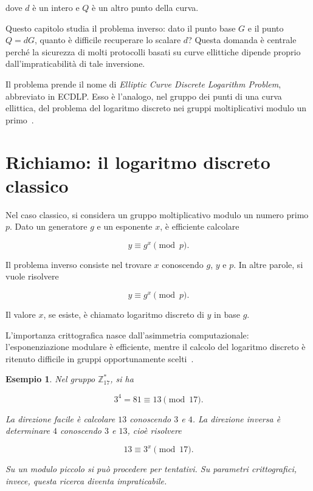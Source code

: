 \documentclass[12pt,a4paper,oneside]{report}
\newtheorem{example}{Esempio}[chapter]
\begin{document}
dove \(d\) è un intero e \(Q\) è un altro punto della curva.

Questo capitolo studia il problema inverso: dato il punto base \(G\) e il punto \(Q=dG\), quanto è difficile recuperare lo scalare \(d\)? Questa domanda è centrale perché la sicurezza di molti protocolli basati su curve ellittiche dipende proprio dall'impraticabilità di tale inversione.

Il problema prende il nome di \textit{Elliptic Curve Discrete Logarithm Problem}, abbreviato in ECDLP. Esso è l'analogo, nel gruppo dei punti di una curva ellittica, del problema del logaritmo discreto nei gruppi moltiplicativi modulo un primo~\cite{margara_complessita,margara_ec}.

\section{Richiamo: il logaritmo discreto classico}

Nel caso classico, si considera un gruppo moltiplicativo modulo un numero primo \(p\). Dato un generatore \(g\) e un esponente \(x\), è efficiente calcolare

\begin{equation}
    y \equiv g^x \pmod p.
\end{equation}

Il problema inverso consiste nel trovare \(x\) conoscendo \(g\), \(y\) e \(p\). In altre parole, si vuole risolvere

\begin{equation}
    y \equiv g^x \pmod p.
\end{equation}

Il valore \(x\), se esiste, è chiamato logaritmo discreto di \(y\) in base \(g\).

L'importanza crittografica nasce dall'asimmetria computazionale: l'esponenziazione modulare è efficiente, mentre il calcolo del logaritmo discreto è ritenuto difficile in gruppi opportunamente scelti~\cite{margara_complessita}.

\begin{example}
Nel gruppo \(\mathbb{Z}_{17}^{\ast}\), si ha

\[
3^4 = 81 \equiv 13 \pmod{17}.
\]

La direzione facile è calcolare \(13\) conoscendo \(3\) e \(4\). La direzione inversa è determinare \(4\) conoscendo \(3\) e \(13\), cioè risolvere

\[
13 \equiv 3^x \pmod{17}.
\]

Su un modulo piccolo si può procedere per tentativi. Su parametri crittografici, invece, questa ricerca diventa impraticabile.
\end{example}
\end{document}
